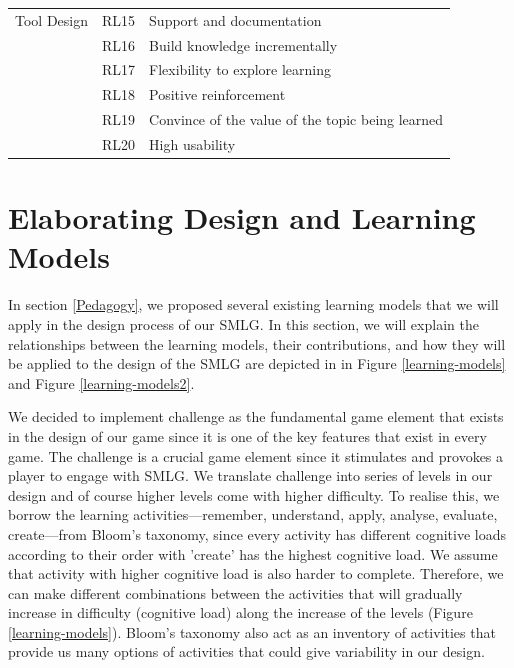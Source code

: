 \documentclass[12pt, a4paper]{report}
\begin{document}
{\begin{table}[ht]
\begin{center}
\begin{tabular}{ p{2cm}p{1cm}p{10cm} }
\hline
\multirow{1}{2cm}{Tool Design}
& RL15 & Support and documentation \\
& RL16 & Build knowledge incrementally \\
& RL17 & Flexibility to explore learning \\
& RL18 & Positive reinforcement \\
& RL19 & Convince of the value of the topic being learned \\ 
& RL20 & High usability \\ 
\hline
\end{tabular}
\end{center}
\end{table}

\section{Elaborating Design and Learning Models}
\label{Elaborating Design and Learning Models}
In section \ref{Pedagogy}, we proposed several existing learning models that we will apply in the design process of our SMLG. In this section, we will explain the relationships between the learning models, their contributions, and how they will be applied to the design of the SMLG are depicted in in Figure \ref{learning-models} and Figure \ref{learning-models2}.

We decided to implement challenge as the fundamental game element that exists in the design of our game since it is one of the key features that exist in every game. The challenge is a crucial game element since it stimulates and provokes a player to engage with SMLG. We translate challenge into series of levels in our design and of course higher levels come with higher difficulty. To realise this, we borrow the learning activities---remember, understand, apply, analyse, evaluate, create---from Bloom's taxonomy, since every activity has different cognitive loads according to their order with 'create' has the highest cognitive load. We assume that activity with higher cognitive load is also harder to complete. Therefore, we can make different combinations between the activities that will gradually increase in difficulty (cognitive load) along the increase of the levels (Figure \ref{learning-models}). Bloom's taxonomy also act as an inventory of activities that provide us many options of activities that could give variability in our design. 

}
\end{document}
